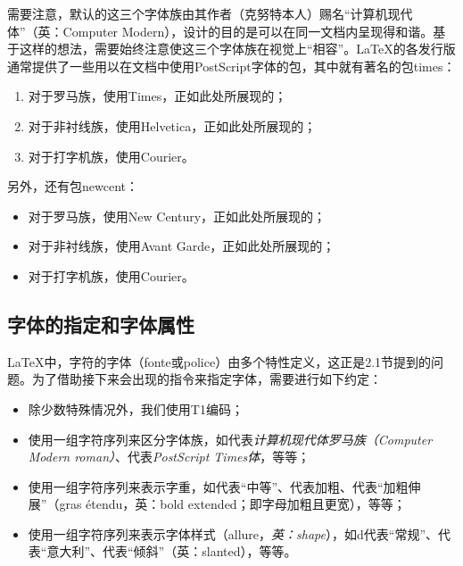 需要注意，默认的这三个字体族由其作者（克努特本人）赐名“计算机现代体”（英：Computer Modern），设计的目的是可以在同一文档内呈现得和谐。基于这样的想法，需要始终注意使这三个字体族在视觉上“相容”。\LaTeX 的各发行版通常提供了一些用以在文档中使用PostScript字体的包，其中就有著名的包\textsf{times}：

\begin{enumerate}
    \item {  \selectfont 对于罗马族，使用Times，正如此处所展现的；} 
    \item {  \selectfont 对于非衬线族，使用Helvetica，正如此处所展现的；}
    \item {  \selectfont 对于打字机族，使用Courier。}
\end{enumerate}

另外，还有包\textsf{newcent}：

\begin{itemize}
    \item {  \selectfont 对于罗马族，使用New Century，正如此处所展现的；} 
    \item {  \selectfont 对于非衬线族，使用Avant Garde，正如此处所展现的；}
    \item {  \selectfont 对于打字机族，使用Courier。}
\end{itemize}

\subsection{字体的指定和字体属性}

\LaTeX 中，字符的字体（fonte或police）由多个特性定义，这正是2.1节提到的问题。为了借助接下来会出现的指令来指定字体，需要进行如下约定：

\begin{itemize}
    \item 除少数特殊情况外，我们使用T1编码；
    \item 使用一组字符序列来区分字体族，如代表\emph{计算机现代体罗马族（Computer Modern roman）}、代表\emph{PostScript Times体}，等等；
    \item 使用一组字符序列来表示字重，如代表“中等”、代表加粗、代表“加粗伸展”（gras étendu，英：bold extended；即字母加粗且更宽），等等；
    \item 使用一组字符序列来表示字体样式（allure，\emph{英：shape}），如d代表“常规”、代表“意大利”、代表“倾斜”（英：slanted），等等。
\end{itemize}

